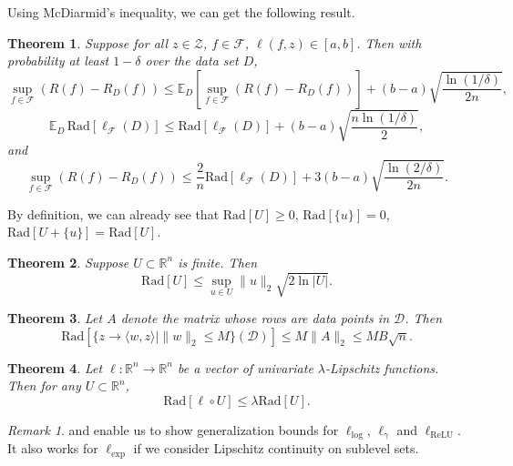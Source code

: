 \documentclass[openany]{book}
\newtheorem{theorem}{Theorem}[chapter]
\theoremstyle{definition}
\theoremstyle{remark}
\newtheorem*{remark}{Remark}
\begin{document}
Using McDiarmid's inequality, we can get the following result.
\begin{theorem}
    Suppose for all $z\in \mathcal{Z}$, $f\in \mathcal{F}$, $\ell(f,z)\in[a,b]$. Then with probability at least $1-\delta$ over the data set $D$,
    \begin{equation*}
        \sup_{f\in \mathcal{F}}\left(R(f)-R_{D}(f)\right)\le \mathbb{E}_{D}\left[\sup_{f\in \mathcal{F}}\left(R(f)-R_{D}(f)\right)\right]+(b-a)\sqrt{\frac{\ln(1/\delta)}{2n}},
    \end{equation*}
    \begin{equation*}
        \mathbb{E}_{D}\,\mathrm{Rad}[\ell_{\mathcal{F}}(D)]\le \mathrm{Rad}[\ell_{\mathcal{F}}(D)]+(b-a)\sqrt{\frac{n\ln(1/\delta)}{2}},
    \end{equation*}
    and
    \begin{equation*}
        \sup_{f\in \mathcal{F}}\left(R(f)-R_{D}(f)\right)\le \frac{2}{n}\mathrm{Rad}[\ell_{\mathcal{F}}(D)]+3(b-a)\sqrt{\frac{\ln(2/\delta)}{2n}}.
    \end{equation*}
\end{theorem}

By definition, we can already see that $\mathrm{Rad}[U]\ge0$, $\mathrm{Rad}[\{u\}]=0$, $\mathrm{Rad}[U+\{u\}]=\mathrm{Rad}[U]$.
\begin{theorem}
    Suppose $U\subset \mathbb{R}^n$ is finite. Then
    \begin{equation*}
        \mathrm{Rad}[U]\le\sup_{u\in U}\|u\|_2\sqrt{2\ln|U|}.
    \end{equation*}
\end{theorem}
\begin{theorem}\label{thm:RadLinear}
    Let $A$ denote the matrix whose rows are data points in $\mathcal{D}$. Then
    \begin{equation*}
        \mathrm{Rad}\left[\{z\to \langle w,z\rangle|\|w\|_2\le M\}(\mathcal{D})\right]\le M\|A\|_2\le MB\sqrt{n}.
    \end{equation*}
\end{theorem}
\begin{theorem}\label{thm:RadLipschitz}
    Let $\ell:\mathbb{R}^n\to \mathbb{R}^n$ be a vector of univariate $\lambda$-Lipschitz functions. Then for any $U\subset \mathbb{R}^n$,
    \begin{equation*}
        \mathrm{Rad}\left[\ell\circ U\right]\le\lambda \mathrm{Rad}\left[U\right].
    \end{equation*}
\end{theorem}
\begin{remark}
     and  enable us to show generalization bounds for $\ell_{\mathrm{log}}$, $\ell_{\gamma}$ and $\ell_{\mathrm{ReLU}}$. It also works for $\ell_{\mathrm{exp}}$ if we consider Lipschitz continuity on sublevel sets.
\end{remark}
\end{document}
